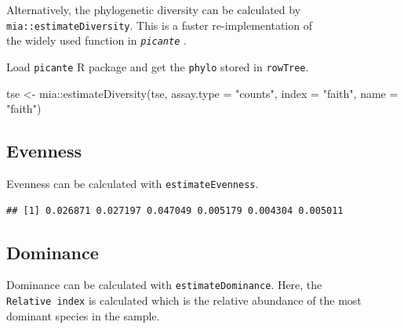 \documentclass[
]{book}
\newenvironment{Shaded}{\begin{snugshade}}{\end{snugshade}}
\newcommand{\AttributeTok}[1]{\textcolor[rgb]{0.77,0.63,0.00}{#1}}
\newcommand{\FunctionTok}[1]{\textcolor[rgb]{0.00,0.00,0.00}{#1}}
\newcommand{\NormalTok}[1]{#1}
\newcommand{\OtherTok}[1]{\textcolor[rgb]{0.56,0.35,0.01}{#1}}
\newcommand{\SpecialCharTok}[1]{\textcolor[rgb]{0.00,0.00,0.00}{#1}}
\newcommand{\StringTok}[1]{\textcolor[rgb]{0.31,0.60,0.02}{#1}}
\begin{document}
Alternatively, the phylogenetic diversity can be calculated by \texttt{mia::estimateDiversity}. This is a faster re-implementation of\\
the widely used function in \emph{\texttt{picante}} \citep[\citet{Kembel2010}]{R_picante}.

Load \texttt{picante} R package and get the \texttt{phylo} stored in \texttt{rowTree}.

\begin{Shaded}
\begin{Highlighting}[]
\NormalTok{tse }\OtherTok{\textless{}{-}}\NormalTok{ mia}\SpecialCharTok{::}\FunctionTok{estimateDiversity}\NormalTok{(tse, }
                              \AttributeTok{assay.type =} \StringTok{"counts"}\NormalTok{,}
                              \AttributeTok{index =} \StringTok{"faith"}\NormalTok{, }
                              \AttributeTok{name =} \StringTok{"faith"}\NormalTok{)}
\end{Highlighting}
\end{Shaded}

\hypertarget{evenness}{%
\subsection{Evenness}\label{evenness}}

Evenness can be calculated with \texttt{estimateEvenness}.

\begin{Shaded}
\end{Shaded}

\begin{verbatim}
## [1] 0.026871 0.027197 0.047049 0.005179 0.004304 0.005011
\end{verbatim}

\hypertarget{dominance}{%
\subsection{Dominance}\label{dominance}}

Dominance can be calculated with \texttt{estimateDominance}. Here, the \texttt{Relative\ index} is calculated which is the relative abundance of the most dominant species in the sample.
\end{document}
